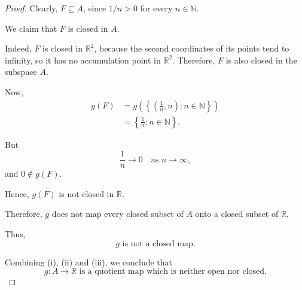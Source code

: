 \begin{proof}
Clearly, \(F\subseteq A\), since \(1/n>0\) for every
\(n\in\mathbb{N}\).

We claim that \(F\) is closed in \(A\).

Indeed, \(F\) is closed in \(\mathbb{R}^2\), because
the second coordinates of its points tend to infinity,
so it has no accumulation point in \(\mathbb{R}^2\).
Therefore, \(F\) is also closed in the subspace \(A\).

Now,
\[
\begin{aligned}
g(F)
&=g\left(\left\{\left(\frac{1}{n},n\right):
n\in\mathbb{N}\right\}\right)\\
&=\left\{\frac{1}{n}:n\in\mathbb{N}\right\}.
\end{aligned}
\]

But
\[
\frac{1}{n}\longrightarrow 0
\quad\text{as }n\longrightarrow\infty,
\]
and \(0\notin g(F)\).

Hence, \(g(F)\) is not closed in \(\mathbb{R}\).

Therefore, \(g\) does not map every closed subset of
\(A\) onto a closed subset of \(\mathbb{R}\).

Thus,
\[
\boxed{g\text{ is not a closed map.}}
\]

Combining (i), (ii) and (iii), we conclude that
\[
\boxed{
g:A\to\mathbb{R}\text{ is a quotient map which is
neither open nor closed.}
}
\]
\end{proof}

